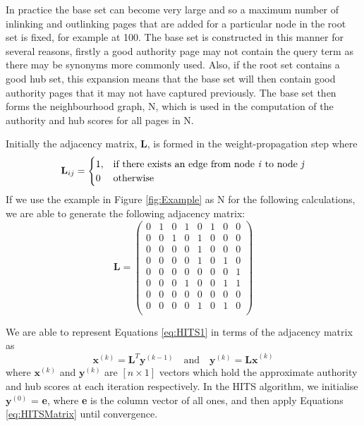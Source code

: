\documentclass[11pt]{report}
\begin{document}
In practice the base set can become very large and so a maximum number of inlinking and outlinking pages that are added for a particular node in the root set is fixed, for example at 100. The base set is constructed in this manner for several reasons, firstly a good authority page may not contain the query term  as there may be synonyms more commonly used. Also, if the root set contains a good hub set, this expansion means that the base set will then contain good authority pages that it may not have captured previously. The base set then forms the neighbourhood graph, N, which is used in the computation of the authority and hub scores for all pages in N.

Initially the adjacency matrix, \textbf{L}, is formed in the weight-propagation step where \[\textbf{L}_{ij} = \begin{cases} 1, & \textnormal{if there exists an edge from node \textit{i} to node \textit{j}}\\ 0 & \textnormal{otherwise}
\end{cases}\]
If we use the example in Figure \ref{fig:Example} as N for the following calculations, we are able to generate the following adjacency matrix:
\begin{equation*}
\textbf{L}=\left(
\begin{array}{cccccccc}
0 & 1 & 0 & 1 & 0 & 1 & 0 & 0 \\
0 & 0 & 1 & 0 & 1 & 0 & 0 & 0 \\
0 & 0 & 0 & 0 & 1 & 0 & 0 & 0 \\
0 & 0 & 0 & 0 & 1 & 0 & 1 & 0 \\
0 & 0 & 0 & 0 & 0 & 0 & 0 & 1 \\
0 & 0 & 0 & 1 & 0 & 0 & 1 & 1 \\
0 & 0 & 0 & 0 & 0 & 0 & 0 & 0 \\
0 & 0 & 0 & 0 & 1 & 0 & 1 & 0 \\
\end{array}
\right)
\end{equation*} 

We are able to represent Equations \eqref{eq:HITS1} in terms of the adjacency matrix as \begin{equation} \label{eq:HITSMatrix}
\textbf{x}^{(k)} = \textbf{L}^T\textbf{y}^{(k-1)}\quad\mathrm{and}\quad \textbf{y}^{(k)}=\textbf{Lx}^{(k)}
\end{equation} where \(\textbf{x}^{(k)}\) and \(\textbf{y}^{(k)}\) are $[\textit{n}\times 1]$ vectors which hold the approximate authority and hub scores at each iteration respectively. In the HITS algorithm, we initialise $\textbf{y}^{(0)}$ = \textbf{e}, where \textbf{e} is the column vector of all ones, and then apply Equations \eqref{eq:HITSMatrix} until convergence. 
\end{document}

